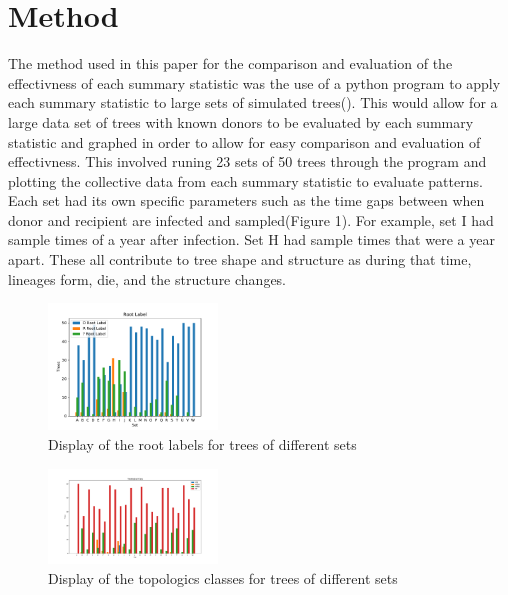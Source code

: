 \documentclass[final,5p,times,twocolumn,authoryear]{elsarticle}
\begin{document}
\section{Method}
\label{method}

The method used in this paper for the comparison and evaluation of the effectivness of each summary statistic was the use of a python program to apply each summary statistic to large sets of simulated trees(\cite{10.1371/journal.pcbi.1009741}). This would allow for a large data set of trees with known donors to be evaluated by each summary statistic and graphed in order to allow for easy comparison and evaluation of effectivness. This involved runing 23 sets of 50 trees through the program and plotting the collective data from each summary statistic to evaluate patterns. Each set had its own specific parameters such as the time gaps between when donor and recipient are infected and sampled(Figure 1). For example, set I had sample times of a year after infection. Set H had sample times that were a year apart. These all contribute to tree shape and structure as during that time, lineages form, die, and the structure changes. 

  
\begin{figure}
	\centering 
	\includegraphics[width=0.4\textwidth, angle=0]{sumstat1graph.pdf}	
	\caption{Display of the root labels for trees of different sets} 
	\label{fig_mom0}%
\end{figure}

\begin{figure}
	\centering 
	\includegraphics[width=0.4\textwidth, angle=0]{sumstat2graph.pdf}	
	\caption{Display of the topologics classes for trees of different sets} 
	\label{fig_mom0}%
\end{figure}
\end{document}
